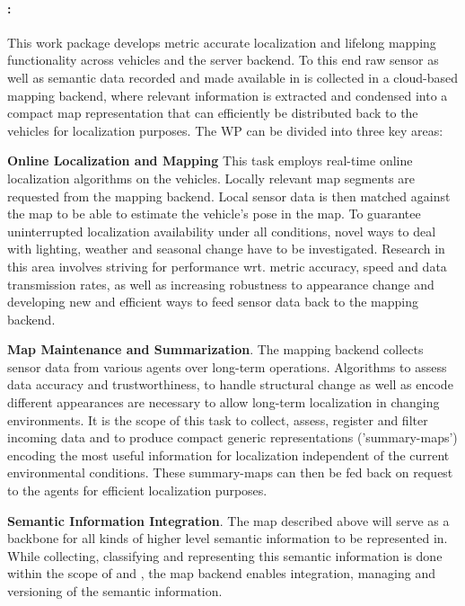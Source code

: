 \paragraph{\textbf{\WPMapping: \WPMappingTitle}}
This work package develops metric accurate localization and lifelong mapping functionality across vehicles and the server backend. To this end raw sensor as well as semantic data recorded and made available in \WPPerception is collected in a cloud-based mapping backend, where relevant information is extracted and condensed into a compact map representation that can  efficiently be distributed back to the vehicles for localization purposes. The WP can be divided into three key areas:
\begin{denseItemize}
\item \textbf{Online Localization and Mapping} This task employs real-time online localization algorithms on the vehicles. Locally relevant map segments are requested from the mapping backend. Local sensor data is then matched against the map to be able to estimate the vehicle's pose in the map. To guarantee uninterrupted localization availability under all conditions, novel ways to deal with lighting, weather and seasonal change have to be investigated. Research in this area involves striving for performance wrt. metric accuracy, speed and data transmission rates, as well as increasing robustness to appearance change and developing new and efficient ways to feed sensor data back to the mapping backend.
\item \textbf{Map Maintenance and Summarization}. The mapping backend collects sensor data from various agents over long-term operations. Algorithms to assess data accuracy and trustworthiness, to handle structural change as well as encode different appearances are necessary to allow long-term localization in changing environments. It is the scope of this task to collect, assess, register and filter incoming data and to produce compact generic representations ('summary-maps') encoding the most useful information for localization independent of the current environmental conditions. These summary-maps can then be fed back on request to the agents for efficient localization purposes.
\item \textbf{Semantic Information Integration}. The map described above will serve as a backbone for all kinds of higher level semantic information to be represented in. While collecting, classifying and representing this semantic information is done within the scope of \WPPerception and \WPSceneUnderstanding, the map backend enables integration, managing and versioning of the semantic information.
\end{denseItemize}


